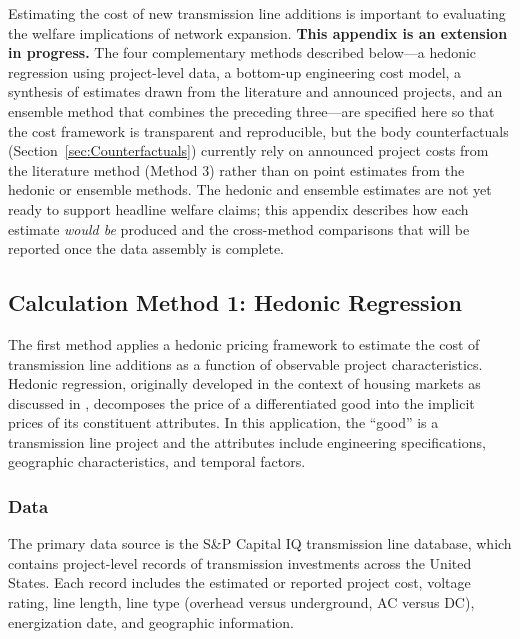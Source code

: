 \documentclass[12pt]{article}
\begin{document}
Estimating the cost of new transmission line additions is important to evaluating the welfare implications of network expansion. \textbf{This appendix is an extension in progress.} The four complementary methods described below---a hedonic regression using project-level data, a bottom-up engineering cost model, a synthesis of estimates drawn from the literature and announced projects, and an ensemble method that combines the preceding three---are specified here so that the cost framework is transparent and reproducible, but the body counterfactuals (Section~\ref{sec:Counterfactuals}) currently rely on announced project costs from the literature method (Method 3) rather than on point estimates from the hedonic or ensemble methods. The hedonic and ensemble estimates are not yet ready to support headline welfare claims; this appendix describes how each estimate \textit{would be} produced and the cross-method comparisons that will be reported once the data assembly is complete.

\subsection{Calculation Method 1: Hedonic Regression}
\label{sec:hedonic_regression}

The first method applies a hedonic pricing framework to estimate the cost of transmission line additions as a function of observable project characteristics. Hedonic regression, originally developed in the context of housing markets as discussed in \cite{tauchen2001estimating}, decomposes the price of a differentiated good into the implicit prices of its constituent attributes. In this application, the ``good'' is a transmission line project and the attributes include engineering specifications, geographic characteristics, and temporal factors.

\subsubsection{Data}

The primary data source is the S\&P Capital IQ transmission line database, which contains project-level records of transmission investments across the United States. Each record includes the estimated or reported project cost, voltage rating, line length, line type (overhead versus underground, AC versus DC), energization date, and geographic information. %
\end{document}
